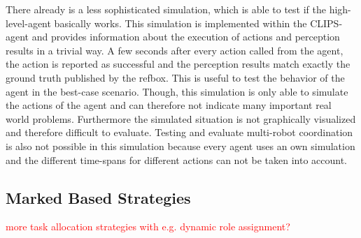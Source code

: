 There already is a less sophisticated simulation, which is able to test if the high-level-agent basically works. This simulation is implemented within the CLIPS-agent and provides information about the execution of actions and perception results in a trivial way. A few seconds after every action called from the agent, the action is reported as successful and the perception results match exactly the ground truth published by the refbox. This is useful to test the behavior of the agent in the best-case scenario. Though, this simulation is only able to simulate the actions of the agent and can therefore not indicate many important real world problems. Furthermore the simulated situation is not graphically visualized and therefore difficult to evaluate. Testing and evaluate multi-robot coordination is also not possible in this simulation because every agent uses an own simulation and the different time-spans for different actions can not be taken into account.

\subsection{Marked Based Strategies}
\textcolor{red}{more task allocation strategies with e.g. dynamic role assignment?}\\

